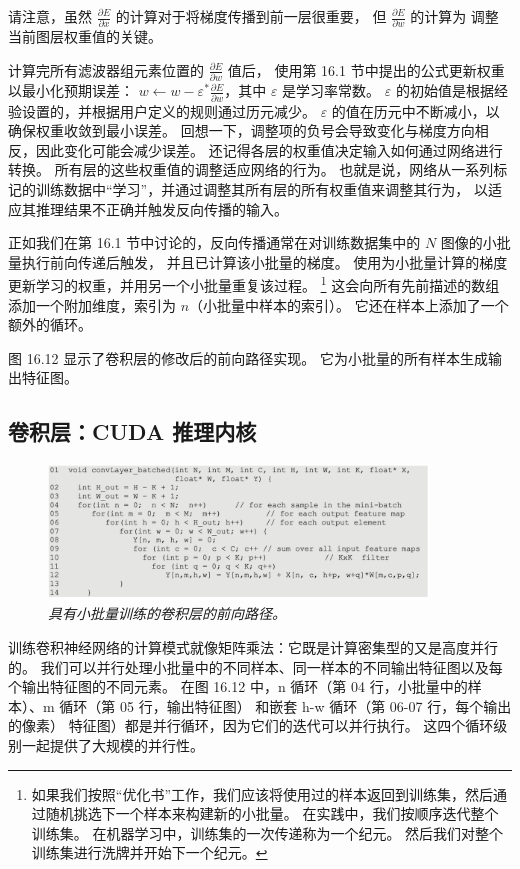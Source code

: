 请注意，虽然 $\frac{\partial E}{\partial x}$ 的计算对于将梯度传播到前一层很重要，
但 $\frac{\partial E}{\partial w}$ 的计算为 调整当前图层权重值的关键。

计算完所有滤波器组元素位置的 $\frac{\partial E}{\partial w}$ 值后，
使用第 16.1 节中提出的公式更新权重以最小化预期误差： $w \leftarrow w-\varepsilon^{*} \frac{\partial E}{\partial w}$，其中 $\varepsilon$ 是学习率常数。 
$\varepsilon$ 的初始值是根据经验设置的，并根据用户定义的规则通过历元减少。 
$\varepsilon$ 的值在历元中不断减小，以确保权重收敛到最小误差。 
回想一下，调整项的负号会导致变化与梯度方向相反，因此变化可能会减少误差。 
还记得各层的权重值决定输入如何通过网络进行转换。 所有层的这些权重值的调整适应网络的行为。 
也就是说，网络从一系列标记的训练数据中“学习”，并通过调整其所有层的所有权重值来调整其行为，
以适应其推理结果不正确并触发反向传播的输入。

正如我们在第 16.1 节中讨论的，反向传播通常在对训练数据集中的 $N$ 图像的小批量执行前向传递后触发，
并且已计算该小批量的梯度。 使用为小批量计算的梯度更新学习的权重，并用另一个小批量重复该过程。 
\footnote{如果我们按照“优化书”工作，我们应该将使用过的样本返回到训练集，然后通过随机挑选下一个样本来构建新的小批量。 
在实践中，我们按顺序迭代整个训练集。 在机器学习中，训练集的一次传递称为一个纪元。 
然后我们对整个训练集进行洗牌并开始下一个纪元。}
这会向所有先前描述的数组添加一个附加维度，索引为 $n$（小批量中样本的索引）。 
它还在样本上添加了一个额外的循环。

图 16.12 显示了卷积层的修改后的前向路径实现。 它为小批量的所有样本生成输出特征图。

\subsection{卷积层：CUDA 推理内核}
\begin{figure}[H]
	\centering
	\includegraphics[width=0.9\textwidth]{figs/F16.12.png}
	\caption{\textit{具有小批量训练的卷积层的前向路径。}}
\end{figure}

训练卷积神经网络的计算模式就像矩阵乘法：它既是计算密集型的又是高度并行的。 
我们可以并行处理小批量中的不同样本、同一样本的不同输出特征图以及每个输出特征图的不同元素。 
在图 16.12 中，n 循环（第 04 行，小批量中的样本）、m 循环（第 05 行，输出特征图）
和嵌套 h-w 循环（第 06-07 行，每个输出的像素） 特征图）都是并行循环，因为它们的迭代可以并行执行。 
这四个循环级别一起提供了大规模的并行性。


